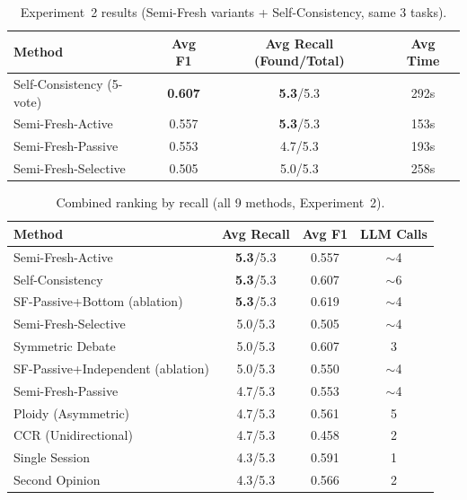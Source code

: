 \documentclass[11pt]{article}
\begin{document}
\begin{table}[t]
\centering
\caption{Experiment~2 results (Semi-Fresh variants + Self-Consistency, same 3 tasks).}
\label{tab:exp2-sf}
\small
\begin{tabular}{@{}lccc@{}}
\toprule
\textbf{Method} & \textbf{Avg F1} & \textbf{Avg Recall (Found/Total)} & \textbf{Avg Time} \\
\midrule
Self-Consistency (5-vote) & \textbf{0.607} & \textbf{5.3}/5.3 & 292s \\
Semi-Fresh-Active         & 0.557          & \textbf{5.3}/5.3 & 153s \\
Semi-Fresh-Passive        & 0.553          & 4.7/5.3            & 193s \\
Semi-Fresh-Selective      & 0.505          & 5.0/5.3            & 258s \\
\bottomrule
\end{tabular}
\end{table}

\begin{table}[t]
\centering
\caption{Combined ranking by recall (all 9 methods, Experiment~2).}
\label{tab:exp2-combined}
\small
\begin{tabular}{@{}lccc@{}}
\toprule
\textbf{Method} & \textbf{Avg Recall} & \textbf{Avg F1} & \textbf{LLM Calls} \\
\midrule
Semi-Fresh-Active         & \textbf{5.3}/5.3 & 0.557 & $\sim$4 \\
Self-Consistency          & \textbf{5.3}/5.3 & 0.607 & $\sim$6 \\
SF-Passive+Bottom (ablation) & \textbf{5.3}/5.3 & 0.619 & $\sim$4 \\
Semi-Fresh-Selective      & 5.0/5.3          & 0.505 & $\sim$4 \\
Symmetric Debate          & 5.0/5.3          & 0.607 & 3       \\
SF-Passive+Independent (ablation) & 5.0/5.3  & 0.550 & $\sim$4 \\
Semi-Fresh-Passive        & 4.7/5.3          & 0.553 & $\sim$4 \\
Ploidy (Asymmetric)       & 4.7/5.3          & 0.561 & 5       \\
CCR (Unidirectional)      & 4.7/5.3          & 0.458 & 2       \\
Single Session            & 4.3/5.3          & 0.591 & 1       \\
Second Opinion            & 4.3/5.3          & 0.566 & 2       \\
\bottomrule
\end{tabular}
\end{table}
\end{document}
